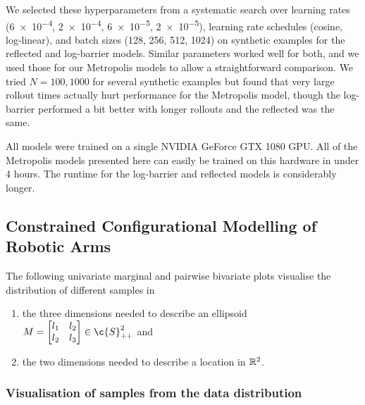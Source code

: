 We selected these hyperparameters from a systematic search over learning rates (\num{6e-4}, \num{2e-4}, \num{6e-5}, \num{2e-5}), learning rate schedules (cosine, log-linear), and batch sizes (128, 256, 512, 1024) on synthetic examples for the reflected and log-barrier models.
Similar parameters worked well for both, and we used those for our Metropolis models to allow a straightforward comparison.
We tried $N=100,1000$ for several synthetic examples but found that very large rollout times actually hurt performance for the Metropolis model, though the log-barrier performed a bit better with longer rollouts and the reflected was the same.

All models were trained on a single NVIDIA GeForce GTX 1080 GPU.
All of the Metropolis models presented here can easily be trained on this hardware in under 4 hours.
The runtime for the log-barrier and reflected models is considerably longer.

\subsection{Constrained Configurational Modelling of Robotic Arms}
\label{sec:app_robotic_arms_spd}

The following univariate marginal and pairwise bivariate plots visualise the distribution of different samples in \begin{enumerate}[label=(\roman*)] \item the three dimensions needed to describe an ellipsoid \(M=\begin{bmatrix} l_{1} & l_{2}\\ l_{2} & l_3 \end{bmatrix}\in\c{S}_{++}^2\) and \item the two dimensions needed to describe a location in \(\mathbb{R}^2\).
\end{enumerate}

\subsubsection{Visualisation of samples from the data distribution}

